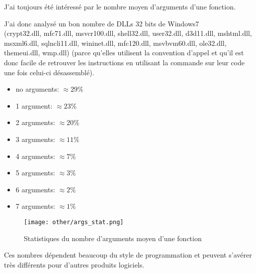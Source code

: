 ﻿
\label{args_stat}

J'ai toujours été intéressé par le nombre moyen d'arguments d'une fonction.

J'ai donc analysé un bon nombre de DLLs 32 bits de Windows7\\
(crypt32.dll, mfc71.dll, msvcr100.dll, shell32.dll, 
user32.dll, d3d11.dll, mshtml.dll, msxml6.dll, sqlncli11.dll, wininet.dll, mfc120.dll, msvbvm60.dll, 
ole32.dll, themeui.dll, wmp.dll) 
(parce qu'elles utilisent la convention d'appel  et qu'il est donc facile de retrouver 
les instructions  en utilisant la commande  sur leur code une fois celui-ci 
désassemblé).

\begin{itemize}
\item no arguments: $\approx 29\%$
\item 1 argument: $\approx 23\%$
\item 2 arguments: $\approx 20\%$
\item 3 arguments: $\approx 11\%$
\item 4 arguments: $\approx 7\%$
\item 5 arguments: $\approx 3\%$
\item 6 arguments: $\approx 2\%$
\item 7 arguments: $\approx 1\%$
\end{itemize}

\begin{figure}[H]
\centering
\texttt{[image: other/args\_stat.png]}
\caption{Statistiques du nombre d'arguments moyen d'une fonction}
\end{figure}

Ces nombres dépendent beaucoup du style de programmation et peuvent s'avérer très différents pour 
d'autres produits logiciels.

